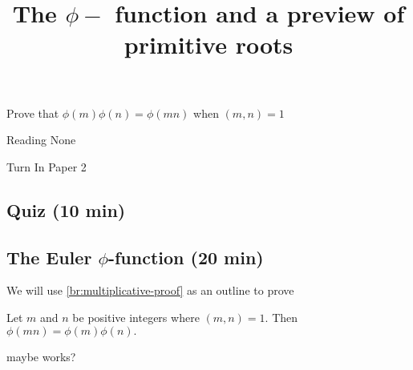 \documentclass{../ximera}
\title{The $\phi-$ function and a preview of primitive roots}
\begin{document}
\begin{abstract}
\end{abstract}
\maketitle


\begin{obj}
  \item Prove that $\phi(m)\phi(n)=\phi(mn)$ when $(m,n)=1$
\end{obj}


\begin{pre}
    \item[Reading] None
    \item[Turn In] Paper 2
\end{pre}

\subsection{Quiz (10 min)}

\subsection*{The Euler $\phi$-function (20 min)}

We will use \autoref{br:multiplicative-proof} as an outline to prove 

\begin{thm*}[Theorem 3.2]\label{thm:phi-multiplicative}
  Let $m$ and $n$ be positive integers where $(m,n)=1$. Then $\phi(mn)=\phi(m)\phi(n).$
\end{thm*}
maybe works?
\end{document}
